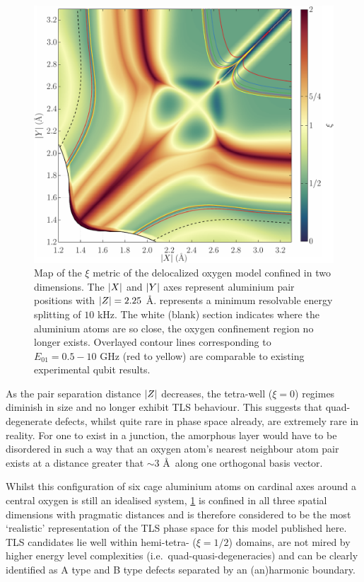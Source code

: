 \begin{figure}[htp]
  \includegraphics[width=\textwidth]{figures/xi225}
  \caption[$\xi$ Metric Phase Map, With $\abs{Z} = 2.25$ \AA]{\label{fig:xi225}Map of the $\xi$ metric of the delocalized oxygen model confined in two dimensions. The $\lvert X\rvert$ and $\lvert Y\rvert$ axes represent aluminium pair positions with $\abs{Z} = 2.25$ \AA.  represents a minimum resolvable energy splitting of $10$ kHz. The white (blank) section indicates where the aluminium atoms are so close, the oxygen confinement region no longer exists. Overlayed contour lines corresponding to $E_{01} = 0.5\!-\!10$ GHz (red to yellow) are comparable to existing experimental qubit results.}
\end{figure}

As the pair separation distance $\lvert Z\rvert$ decreases, the tetra-well ($\xi=0$) regimes diminish in size and no longer exhibit TLS behaviour.
This suggests that quad-degenerate defects, whilst quite rare in phase space already, are extremely rare in reality.
For one to exist in a junction, the amorphous layer would have to be disordered in such a way that an oxygen atom's nearest neighbour atom pair exists at a distance greater that $\sim 3$ \AA\ along one orthogonal basis vector.

Whilst this configuration of six cage aluminium atoms on cardinal axes around a central oxygen is still an idealised system, \cref{fig:xi225} is confined in all three spatial dimensions with pragmatic distances and is therefore considered to be the most `realistic' representation of the TLS phase space for this model published here.
TLS candidates lie well within hemi-tetra- ($\xi=1/2$) domains, are not mired by higher energy level complexities (i.e.\ quad-quasi-degeneracies) and can be clearly identified as A type and B type defects separated by an (an)harmonic boundary.


